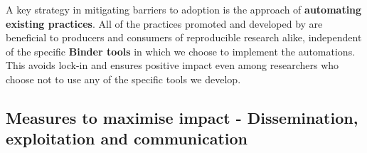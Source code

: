 A key strategy in mitigating barriers to adoption is the approach of \textbf{automating existing practices}.
All of the practices promoted and developed by \TheProject are beneficial to
producers and consumers of reproducible research alike,
independent of the specific \textbf{Binder tools} in which we choose to implement the automations.
This avoids lock-in and ensures positive impact even among researchers who choose not to use any of the specific tools we develop.

\subsection{Measures to maximise impact - Dissemination, exploitation and communication}



